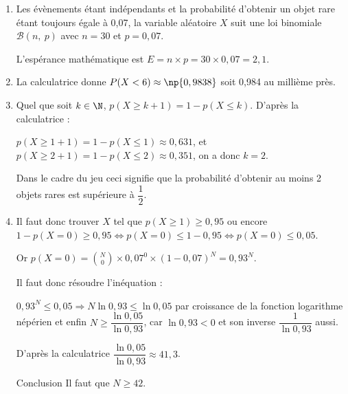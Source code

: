 \begin{enumerate}
\item 
Les évènements étant indépendants et la probabilité d'obtenir un objet rare étant toujours égale à 0,07, la variable aléatoire $X$ suit une loi binomiale $\mathcal{B}(n,\:p)$ avec $n = 30$ et $p = 0,07$.

L'espérance mathématique est $E = n \times p = 30 \times 0,07 = 2,1$.
\item 

La calculatrice donne $P(X < 6) \approx \np{0,9838}$ soit 0,984 au millième près.
\item 
Quel que soit $k \in \N$, \: $p(X \geqslant k + 1) = 1 - p(X \leqslant k)$.
D'après la calculatrice :

$p(X \geqslant 1 + 1) = 1 - p(X \leqslant 1) \approx 0,631$, et $p(X \geqslant 2 + 1) = 1 - p(X \leqslant 2) \approx 0,351$, on a donc $k = 2$.

Dans le cadre du jeu ceci signifie que la probabilité d'obtenir au moins 2 objets rares est supérieure à $\dfrac12$.
\item 





Il faut donc trouver $X$ tel que $p(X \geqslant 1) \geqslant 0,95$ ou encore $1 - p(X = 0) \geqslant 0,95 \iff p(X = 0) \leqslant 1 - 0,95 \iff p(X = 0) \leqslant 0,05$.

Or $p(X = 0) = \binom{N}{0} \times 0,07^0 \times (1 - 0,07)^N = 0,93^N$.

Il faut donc résoudre l'inéquation :

$0,93^N \leqslant 0,05 \Rightarrow N \ln 0,93 \leqslant \ln 0,05$ par croissance de la fonction logarithme népérien  et enfin $N \geqslant \dfrac{\ln 0,05}{\ln 0,93}$, car $\ln 0,93 < 0$ et son inverse $\dfrac{1}{\ln 0,93}$ aussi.

D'après la calculatrice $\dfrac{\ln 0,05}{\ln 0,93} \approx 41,3$.

Conclusion Il faut que $N \geqslant 42$.
\end{enumerate}
